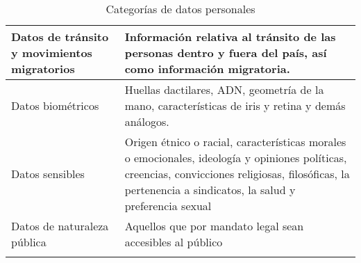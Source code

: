 \begin{center}
\begin{longtable}{|p{4cm}|p{10cm}|}
     Datos de tránsito y movimientos migratorios & Información relativa al tránsito de las personas dentro y fuera del país, así como información migratoria.\\  \hline
     
    Datos biométricos  & Huellas dactilares, ADN, geometría de la mano, características de iris y retina y demás análogos.\\  \hline
    
    Datos sensibles & Origen étnico o racial, características morales o emocionales, ideología y opiniones políticas, creencias, convicciones religiosas, filosóficas, la pertenencia a sindicatos, la salud y preferencia sexual \\  \hline
    Datos de naturaleza pública & Aquellos que por mandato legal sean accesibles al público \\  \hline
   \caption{Categorías de datos personales}
 \end{longtable}
 \end{center}




